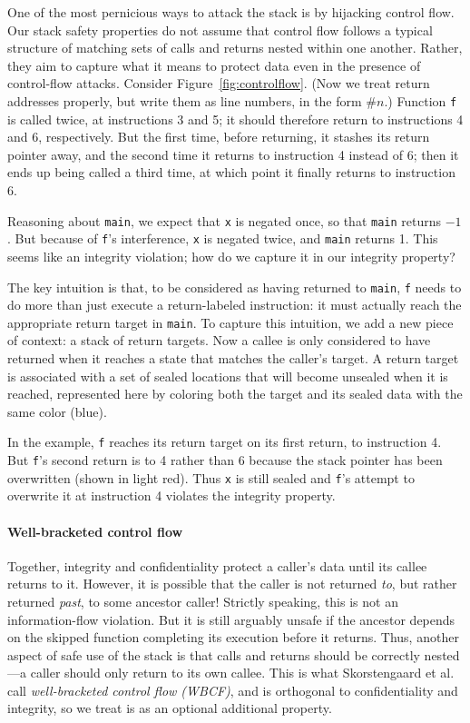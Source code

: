 \documentclass[10pt,conference]{ieeetran}%
\theoremstyle{definition}
\begin{document}
One of the most pernicious ways to attack the stack is by hijacking control flow.
Our stack safety properties do not assume that control flow follows a typical structure
of matching sets of calls and returns nested within one another.
Rather, they aim to capture what it means to protect data even in the presence of control-flow attacks.
Consider Figure~\ref{fig:controlflow}.
(Now we treat return addresses properly, but write them as line numbers, in the
form $\#n$.)
Function {\tt f} is called twice, at instructions 3 and 5; it should therefore return to instructions
4 and 6, respectively. But the first time, before returning, it stashes its
return pointer away, and the second time it returns to instruction 4 instead of 6; then it ends
up being called a third time, at which point it finally returns to instruction 6.

Reasoning about {\tt main}, we expect that {\tt x} is negated once, so that {\tt main} returns
$-1$. But because of {\tt f}'s interference, {\tt x} is negated twice, and {\tt main} returns 1.
This seems like an integrity violation; how do we capture it in our
\ifspace integrity \fi property?

The key intuition is that, to be considered as having returned to {\tt main}, {\tt f} needs
to do more than just execute a return-labeled instruction: it must actually reach the
appropriate return target in {\tt main}.
To capture this intuition, we add a new piece of context:
a stack of return targets.  Now a callee is
only considered to have returned when it reaches a state that matches the caller's target.
A return target is associated with a set of sealed locations that will become unsealed
when it is reached, represented here by coloring both the target and its sealed data with the
same color (blue).

In the example, {\tt f} reaches its return target on its first return, to instruction 4.
But {\tt f}'s second return is to 4 rather than 6
because the stack pointer has been overwritten (shown in light red).
Thus {\tt x} is still sealed and {\tt f}'s attempt to overwrite it at instruction 4
violates the integrity property.

\paragraph*{Well-bracketed control flow} Together,
integrity and confidentiality protect a caller's data until its callee
returns to it. However, it is possible that the caller is not
returned {\em to}, but rather returned {\em past}, to some ancestor caller!
Strictly speaking, this is not an information-flow violation. But it is still
arguably unsafe if the ancestor depends on the skipped function completing its execution before
it returns.
%
Thus, another aspect of safe use of the stack is that calls
and returns should be correctly nested---a caller should
only return to its own callee.  This is what Skorstengaard et al.\cite{SkorstengaardSTKJFP}
call \emph{well-bracketed control flow (WBCF)}, and is orthogonal to
confidentiality and integrity, so we treat is as an optional additional property.
\end{document}
